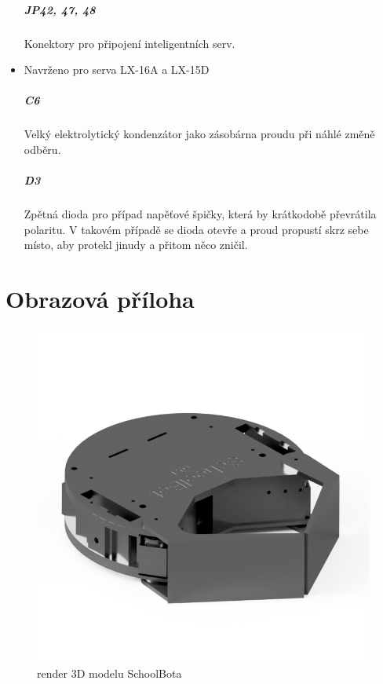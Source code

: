\documentclass{template/socthesis}
\begin{document}
\begin{itemize}
	\paragraph*{JP42, 47, 48}
	Konektory pro připojení inteligentních serv.
	\item Navrženo pro serva LX-16A a LX-15D
	
	\paragraph*{C6}
	Velký elektrolytický kondenzátor jako zásobárna proudu při náhlé změně odběru.
		
	\paragraph*{D3}
	Zpětná dioda pro případ napěťové špičky, která by krátkodobě převrátila polaritu. V takovém případě se dioda otevře a proud propustí skrz sebe místo, aby protekl jinudy a přitom něco zničil.
	
	\end{itemize}

\chapter{Obrazová příloha}

\begin{figure}[h]
	\centering
	\includegraphics[width=1.0\textwidth]{img/SchoolBot.png}
	\caption{render 3D modelu SchoolBota}
\end{figure}
\end{document}
